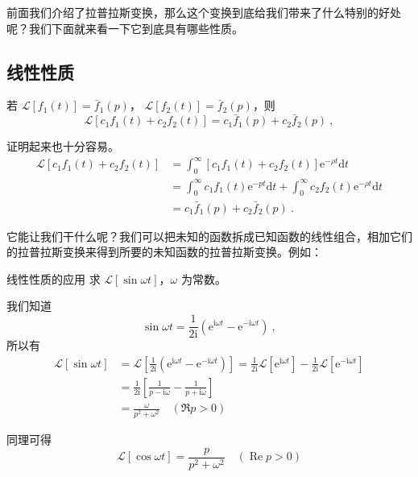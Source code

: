 

前面我们介绍了拉普拉斯变换，那么这个变换到底给我们带来了什么特别的好处呢？我们下面就来看一下它到底具有哪些性质。

\subsection{线性性质}


若 $\mathscr L[f_1(t)] = \bar f_1(p)$， $\mathscr L[f_2(t)] = \bar f_2(p)$，则
\begin{equation}
\mathscr L[c_1f_1(t)+c_2f_2(t)] = c_1\bar f_1(p) + c_2\bar f_2(p)~,
\end{equation}

证明起来也十分容易。
\begin{equation}
\begin{aligned} \mathscr L[c_{1} f_{1}(t)+c_{2} f_{2}(t)] & = \int_{0}^{\infty}\left[c_{1} f_{1}(t)+c_{2} f_{2}(t)\right] \mathrm{e}^{-\rho t} \mathrm{d} t \\ &=\int_{0}^{\infty} c_{1} f_{1}(t) \mathrm{e}^{-p t} \mathrm{d} t+\int_{0}^{\infty} c_{2} f_{2}(t) \mathrm{e}^{-\rho t} \mathrm{d} t \\ &=c_{1} \bar{f}_{1}(p)+c_{2} \bar{f}_{2}(p) ~.\end{aligned}
\end{equation}

它能让我们干什么呢？我们可以把未知的函数拆成已知函数的线性组合，相加它们的拉普拉斯变换来得到所要的未知函数的拉普拉斯变换。例如：
\begin{example}{线性性质的应用}
求 $\mathscr L[\sin \omega t]$，$\omega$ 为常数。

我们知道
\begin{equation}
\sin \omega t=\frac{1}{2 \mathrm{i}}\left(\mathrm{e}^{\mathrm{i} \omega t}-\mathrm{e}^{-\mathrm{i} \omega t}\right)~,
\end{equation}
所以有
\begin{equation}
\begin{aligned} \mathscr{L}[\sin \omega t] &=\mathscr{L}\left[\frac{1}{2 \mathrm{i}}\left(\mathrm{e}^{\mathrm{i} \omega t}-\mathrm{e}^{-\mathrm{i} \omega t}\right)\right]=\frac{1}{2 \mathrm{i}} \mathscr{L}\left[\mathrm{e}^{\mathrm{i} \omega t}\right]-\frac{1}{2 \mathrm{i}}\mathscr{L}\left[\mathrm{e}^{-\mathrm{i} \omega t}\right] \\ &=\frac{1}{2 \mathrm{i}}\left[\frac{1}{p-\mathrm{i} \omega}-\frac{1}{p+\mathrm{i} \omega}\right] \\ &=\frac{\omega}{p^{2}+\omega^{2}} \quad(\Re p>0) \end{aligned}
\end{equation}

同理可得
\begin{equation}
\mathscr{L}[\cos \omega t]=\frac{p}{p^{2}+\omega^{2}} \quad(\operatorname{Re} p>0)
\end{equation}
\end{example}

